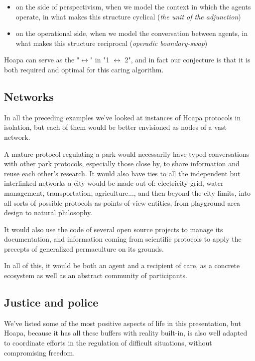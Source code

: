 \documentclass[11pt]{article}
\begin{document}
\begin{itemize}

\item on the side of perspectivism, when we model the context in which the agents operate, in what makes this structure cyclical (\emph{the unit of the adjunction})

\item on the operational side, when we model the conversation between agents, in what makes this structure reciprocal (\emph{operadic boundary-swap})

\end{itemize}

Hoapa can serve as the "\ensuremath{\leftrightarrow}" in "1 \ensuremath{\leftrightarrow} 2", and in fact our conjecture is that it is both required and optimal for this caring algorithm.

\subsection{Networks}

In all the preceding examples we've looked at instances of Hoapa protocols in isolation, but each of them would be better envisioned as nodes of a vast network.

A mature protocol regulating a park would necessarily have typed conversations with other park protocols, especially those close by, to share information and reuse each other's research. It would also have ties to all the independent but interlinked networks a city would be made out of: electricity grid, water management, transportation, agriculture..., and then beyond the city limits, into all sorts of possible protocols-as-points-of-view entities, from playground area design to natural philosophy.

It would also use the code of several open source projects to manage its documentation, and information coming from scientific protocols to apply the precepts of generalized permaculture on its grounds.

In all of this, it would be both an agent and a recipient of care, as a concrete ecosystem as well as an abstract community of participants.

\subsection{Justice and police}

We've listed some of the most positive aspects of life in this presentation, but Hoapa, because it has all these buffers with reality built-in, is also well adapted to coordinate efforts in the regulation of difficult situations, without compromising freedom.
\end{document}
